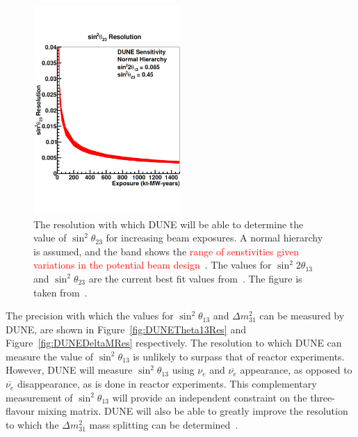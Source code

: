 \begin{figure}
  \centering
  \includegraphics[width=0.5\textwidth]{DUNETheta23Res}
  \caption[The resolution with which DUNE will be able to determine the value of $\sin^{2}\theta_{23}$ for increasing beam exposures]
          {The resolution with which DUNE will be able to determine the value of $\sin^{2}\theta_{23}$ for increasing beam exposures. A normal hierarchy is assumed, and the band shows the \textcolor{red}{range of senstivities given variations in the potential beam design}~\citep{DUNECDR_V3}. The values for $\sin^{2}2\theta_{13}$ and $\sin^{2}\theta_{23}$ are the current best fit values from~\citep{NuFit2014}. The figure is taken from~\citep{DUNECDR_V2}.}
  \label{fig:DUNETheta23Res}
\end{figure}

The precision with which the values for $\sin^{2}\theta_{13}$ and $\Delta m^{2}_{31}$ can be measured by DUNE, are shown in Figure~\ref{fig:DUNETheta13Res} and Figure~\ref{fig:DUNEDeltaMRes} respectively. The resolution to which DUNE can measure the value of $\sin^{2}\theta_{13}$ is unlikely to surpass that of reactor experiments. However, DUNE will measure $\sin^{2}\theta_{13}$ using $\nu_e$ and $\overline{\nu_e}$ appearance, as opposed to $\overline{\nu_e}$ disappearance, as is done in reactor experiments. This complementary measurement of $\sin^{2}\theta_{13}$ will provide an independent constraint on the three-flavour mixing matrix. DUNE will also be able to greatly improve the resolution to which the $\Delta m^{2}_{31}$ mass splitting can be determined~\citep{DUNECDR_V2}. \\

